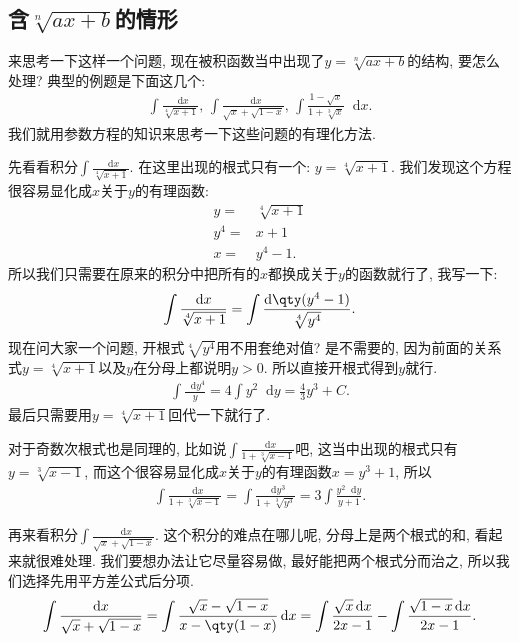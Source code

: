 \documentclass{ctexbook}
\newcommand*{\dif}{\mathop{}\!\mathrm{d}}
\begin{document}
{\subsection{含$\sqrt[n]{ax+b}$的情形}
来思考一下这样一个问题, 现在被积函数当中出现了$y=\sqrt[n]{ax+b}$的结构, 要怎么处理? 典型的例题是下面这几个: 
\begin{align*}
\int\frac{\dif{x}}{\sqrt[4]{x+1}},\,\int\frac{\dif{x}}{\sqrt{x}+\sqrt{1-x}},\,\int\frac{1-\sqrt{x}}{1+\sqrt[3]{x}}\dif{x}
.\end{align*}
我们就用参数方程的知识来思考一下这些问题的有理化方法. \par
先看看积分$\int\frac{\dif{x}}{\sqrt[4]{x+1}}$. 在这里出现的根式只有一个: $y=\sqrt[4]{x+1}$. 我们发现这个方程很容易显化成$x$关于$y$的有理函数: 
\begin{align*}
y={}&\sqrt[4]{x+1}\\
y^{4}={}&x+1\\
x={}&y^{4}-1
.\end{align*}
所以我们只需要在原来的积分中把所有的$x$都换成关于$y$的函数就行了, 我写一下: 
\begin{align*}
\int\frac{\dif{x}}{\sqrt[4]{x+1}}=\int\frac{\dif{\qty(y^{4}-1)}}{\sqrt[4]{y^{4}}}
.\end{align*}
现在问大家一个问题, 开根式$\sqrt[4]{y^{4}}$用不用套绝对值? 是不需要的, 因为前面的关系式$y=\sqrt[4]{x+1}$以及$y$在分母上都说明$y>0$. 所以直接开根式得到$y$就行. 
\begin{align*}
\int\frac{\dif{y^{4}}}{y}=4\int y^{2}\dif{y}=\frac{4}{3}y^{3}+C
.\end{align*}
最后只需要用$y=\sqrt[4]{x+1}$回代一下就行了. \par
对于奇数次根式也是同理的, 比如说$\int\frac{\dif{x}}{1+\sqrt[3]{x-1}}$吧, 这当中出现的根式只有$y=\sqrt[3]{x-1}$, 而这个很容易显化成$x$关于$y$的有理函数$x=y^{3}+1$, 所以
\begin{align*}
\int\frac{\dif{x}}{1+\sqrt[3]{x-1}}=\int\frac{\dif{y^{3}}}{1+\sqrt[3]{y^{3}}}=3\int\frac{y^{2}\dif{y}}{y+1}
.\end{align*}\par
再来看积分$\int\frac{\dif{x}}{\sqrt{x}+\sqrt{1-x}}$. 这个积分的难点在哪儿呢, 分母上是两个根式的和, 看起来就很难处理. 我们要想办法让它尽量容易做, 最好能把两个根式分而治之, 所以我们选择先用平方差公式后分项. 
\begin{align*}
\int\frac{\dif{x}}{\sqrt{x}+\sqrt{1-x}}=\int\frac{\sqrt{x}-\sqrt{1-x}}{x-\qty(1-x)}\dif{x}=\int\frac{\sqrt{x}\dif{x}}{2x-1}-\int\frac{\sqrt{1-x}\dif{x}}{2x-1}
.\end{align*}
}
\end{document}

